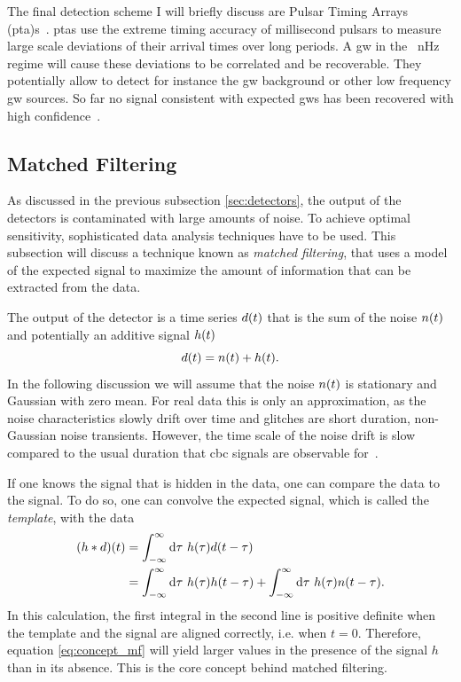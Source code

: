 The final detection scheme I will briefly discuss are Pulsar Timing Arrays (\acrshort{pta})s~\cite{Hobbs:2008yn, Demorest:2009ex}. \acrshort{pta}s use the extreme timing accuracy of millisecond pulsars to measure large scale deviations of their arrival times over long periods. A \acrshort{gw} in the \SI{}{\nano\hertz} regime will cause these deviations to be correlated and be recoverable. They potentially allow to detect for instance the \acrshort{gw} background or other low frequency \acrshort{gw} sources. So far no signal consistent with expected \acrshort{gw}s has been recovered with high confidence~\cite{NANOGrav:2020gpb, NANOGrav:2020bcs}.


\subsection{Matched Filtering}\label{sec:matched_filtering}
As discussed in the previous subsection \ref{sec:detectors}, the output of the detectors is contaminated with large amounts of noise. To achieve optimal sensitivity, sophisticated data analysis techniques have to be used. This subsection will discuss a technique known as \emph{matched filtering}, that uses a model of the expected signal to maximize the amount of information that can be extracted from the data.

The output of the detector is a time series $d{\left( t \right)}$ that is the sum of the noise $n{\left( t \right)}$ and potentially an additive signal $h{\left( t \right)}$
\begin{equation}
d{\left( t \right)} = n{\left( t \right)} + h{\left( t \right)}.
\end{equation}
In the following discussion we will assume that the noise $n{\left( t \right)}$ is stationary and Gaussian with zero mean. For real data this is only an approximation, as the noise characteristics slowly drift over time and glitches are short duration, non-Gaussian noise transients. However, the time scale of the noise drift is slow compared to the usual duration that \acrshort{cbc} signals are observable for~\cite{Kumar:2022tto}.

If one knows the signal that is hidden in the data, one can compare the data to the signal. To do so, one can convolve the expected signal, which is called the \emph{template}, with the data
\begin{align}\label{eq:concept_mf}
\lr{h\ast d}\lr{t} & = \int_{-\infty}^{\infty}\diff{\tau}\ h\lr{\tau}d\lr{t-\tau}\nonumber\\
& = \int_{-\infty}^{\infty}\diff{\tau}\ h\lr{\tau}h\lr{t-\tau} + \int_{-\infty}^{\infty}\diff{\tau}\ h\lr{\tau}n\lr{t-\tau}.
\end{align}
In this calculation, the first integral in the second line is positive definite when the template and the signal are aligned correctly, i.e. when $t=0$. Therefore, equation \eqref{eq:concept_mf} will yield larger values in the presence of the signal $h$ than in its absence. This is the core concept behind matched filtering.

